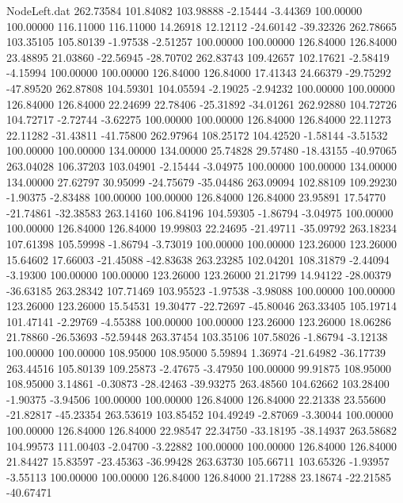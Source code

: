 \begin{filecontents}{NodeLeft.dat}
 262.73584  101.84082  103.98888    -2.15444   -3.44369  100.00000  100.00000  116.11000  116.11000   14.26918   12.12112  -24.60142  -39.32326
 262.78665  103.35105  105.80139    -1.97538   -2.51257  100.00000  100.00000  126.84000  126.84000   23.48895   21.03860  -22.56945  -28.70702
 262.83743  109.42657  102.17621    -2.58419   -4.15994  100.00000  100.00000  126.84000  126.84000   17.41343   24.66379  -29.75292  -47.89520
 262.87808  104.59301  104.05594    -2.19025   -2.94232  100.00000  100.00000  126.84000  126.84000   22.24699   22.78406  -25.31892  -34.01261
 262.92880  104.72726  104.72717    -2.72744   -3.62275  100.00000  100.00000  126.84000  126.84000   22.11273   22.11282  -31.43811  -41.75800
 262.97964  108.25172  104.42520    -1.58144   -3.51532  100.00000  100.00000  134.00000  134.00000   25.74828   29.57480  -18.43155  -40.97065
 263.04028  106.37203  103.04901    -2.15444   -3.04975  100.00000  100.00000  134.00000  134.00000   27.62797   30.95099  -24.75679  -35.04486
 263.09094  102.88109  109.29230    -1.90375   -2.83488  100.00000  100.00000  126.84000  126.84000   23.95891   17.54770  -21.74861  -32.38583
 263.14160  106.84196  104.59305    -1.86794   -3.04975  100.00000  100.00000  126.84000  126.84000   19.99803   22.24695  -21.49711  -35.09792
 263.18234  107.61398  105.59998    -1.86794   -3.73019  100.00000  100.00000  123.26000  123.26000   15.64602   17.66003  -21.45088  -42.83638
 263.23285  102.04201  108.31879    -2.44094   -3.19300  100.00000  100.00000  123.26000  123.26000   21.21799   14.94122  -28.00379  -36.63185
 263.28342  107.71469  103.95523    -1.97538   -3.98088  100.00000  100.00000  123.26000  123.26000   15.54531   19.30477  -22.72697  -45.80046
 263.33405  105.19714  101.47141    -2.29769   -4.55388  100.00000  100.00000  123.26000  123.26000   18.06286   21.78860  -26.53693  -52.59448
 263.37454  103.35106  107.58026    -1.86794   -3.12138  100.00000  100.00000  108.95000  108.95000    5.59894    1.36974  -21.64982  -36.17739
 263.44516  105.80139  109.25873    -2.47675   -3.47950  100.00000   99.91875  108.95000  108.95000    3.14861   -0.30873  -28.42463  -39.93275
 263.48560  104.62662  103.28400    -1.90375   -3.94506  100.00000  100.00000  126.84000  126.84000   22.21338   23.55600  -21.82817  -45.23354
 263.53619  103.85452  104.49249    -2.87069   -3.30044  100.00000  100.00000  126.84000  126.84000   22.98547   22.34750  -33.18195  -38.14937
 263.58682  104.99573  111.00403    -2.04700   -3.22882  100.00000  100.00000  126.84000  126.84000   21.84427   15.83597  -23.45363  -36.99428
 263.63730  105.66711  103.65326    -1.93957   -3.55113  100.00000  100.00000  126.84000  126.84000   21.17288   23.18674  -22.21585  -40.67471

\end{filecontents}
